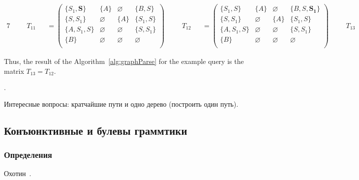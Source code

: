 \begin{example}
\begin{alignat*}{7}
& &&T_{11} &&= \begin{pmatrix}
\{S_1, \pmb{S}\}     & \{A\}       & \varnothing & \{B, S\}    \\
\{S, S_1\}       & \varnothing & \{A\}       & \{S_1, S\}     \\
\{A, S_1, S\}  & \varnothing & \varnothing & \{S, S_1\} \\
\{B\}       & \varnothing & \varnothing & \varnothing \\
\end{pmatrix} \ \ \ \ &&T_{12} &&= \begin{pmatrix}
\{S_1, S\}     & \{A\}       & \varnothing & \{B, S, \pmb{S_1}\}    \\
\{S, S_1\}       & \varnothing & \{A\}       & \{S_1, S\}     \\
\{A, S_1, S\}  & \varnothing & \varnothing & \{S, S_1\} \\
\{B\}       & \varnothing & \varnothing & \varnothing \\
\end{pmatrix} \ \ \ \ &&T_{13} &&= \begin{pmatrix}
\{S_1, S\}     & \{A\}       & \varnothing & \{B, S, S_1\}    \\
\{S, S_1\}       & \varnothing & \{A\}       & \{S_1, S\}     \\
\{A, S_1, S\}  & \varnothing & \varnothing & \{S, S_1\} \\
\{B\}       & \varnothing & \varnothing & \varnothing \\
\end{pmatrix}
\end{alignat*}

Thus, the result of the Algorithm~\ref{alg:graphParse} for the example query is the matrix $T_{13} = T_{12}$. 

\end{example}.

Интересные вопросы: кратчайшие пути и одно дерево (построить один путь).

\subsection{Конъюнктивные и булевы граммтики}

\subsubsection{Определения}

Охотин~\cite{Okhotin:2003:BG:1758089.1758123,f60a33d409364914be560cac0e54b12c,Okhotin:2014:PMM:2565359.2565379}.

